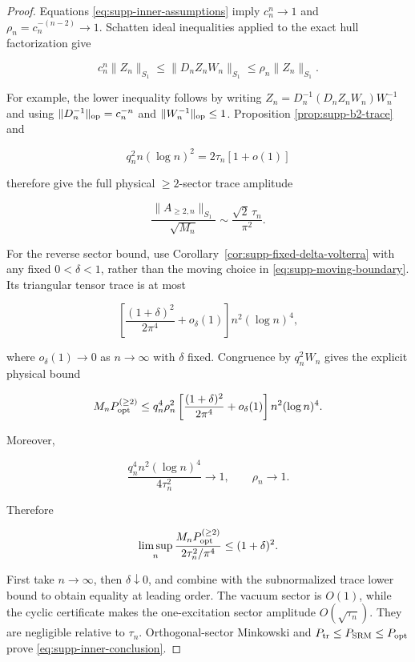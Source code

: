 \begin{proof}
Equations \eqref{eq:supp-inner-assumptions} imply
\(c_n^n\to1\) and \(\rho_n=c_n^{-(n-2)}\to1\).  Schatten ideal
inequalities applied to the exact hull factorization give

\begin{equation}\label{eq:supp-inner-schatten-sandwich}
 c_n^n\|Z_n\|_{S_1}
 \le\|D_nZ_nW_n\|_{S_1}
 \le\rho_n\|Z_n\|_{S_1}.
\end{equation}

For example, the lower inequality follows by writing
\(Z_n=D_n^{-1}(D_nZ_nW_n)W_n^{-1}\) and using
\(\|D_n^{-1}\|_{\rm op}=c_n^{-n}\) and
\(\|W_n^{-1}\|_{\rm op}\le1\).  Proposition
\ref{prop:supp-b2-trace} and

\[
 q_n^2n(\log n)^2=2\tau_n[1+o(1)]
\]

therefore give the full physical \(\ge2\)-sector trace amplitude

\begin{equation}\label{eq:supp-inner-sector-amplitude}
 \frac{\|A_{\ge2,n}\|_{S_1}}{\sqrt{M_n}}
 \sim\frac{\sqrt2\,\tau_n}{\pi^2}.
\end{equation}

For the reverse sector bound, use
Corollary~\ref{cor:supp-fixed-delta-volterra} with any fixed
\(0<\delta<1\), rather than the moving choice in
\eqref{eq:supp-moving-boundary}.  Its triangular tensor trace is at most

\[
 \left[\frac{(1+\delta)^2}{2\pi^4}+o_\delta(1)\right]
 n^2(\log n)^4,
\]

where \(o_\delta(1)\to0\) as \(n\to\infty\) with \(\delta\) fixed.
Congruence by
\(q_n^2W_n\) gives the explicit physical bound

\[
 M_nP_{\rm opt}^{(\ge2)}
 \le q_n^4\rho_n^2
 \left[\frac{(1+\delta)^2}{2\pi^4}+o_\delta(1)\right]
 n^2(\log n)^4.
\]

Moreover,

\[
 \frac{q_n^4n^2(\log n)^4}{4\tau_n^2}\longrightarrow1,
 \qquad \rho_n\longrightarrow1.
\]

Therefore

\[
 \limsup_n
 \frac{M_nP_{\rm opt}^{(\ge2)}}{2\tau_n^2/\pi^4}
 \le(1+\delta)^2.
\]

First take \(n\to\infty\), then \(\delta\downarrow0\), and combine with
the subnormalized trace lower bound to obtain equality at leading order.
The vacuum sector is \(O(1)\), while the cyclic certificate makes the
one-excitation sector amplitude \(O(\sqrt{\tau_n})\).  They are negligible
relative to \(\tau_n\).  Orthogonal-sector Minkowski and
\(P_{\rm tr}\le P_{\rm SRM}\le P_{\rm opt}\) prove
\eqref{eq:supp-inner-conclusion}.
\end{proof}

